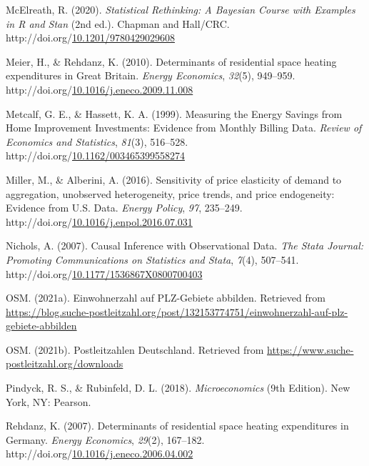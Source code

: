 \documentclass[12pt,twoside]{reedthesis}
\newlength{\cslhangindent}
\newenvironment{CSLReferences}[2] %
 {%
  \setlength{\parindent}{0pt}
  \ifodd #1 \everypar{\setlength{\hangindent}{\cslhangindent}}\ignorespaces\fi
  \ifnum #2 > 0
  \setlength{\parskip}{#2\baselineskip}
  \fi
 }%
 {}
\begin{document}
\begin{CSLReferences}{1}{0}
\leavevmode{}%
McElreath, R. (2020). \emph{Statistical Rethinking: A Bayesian Course with Examples in R and Stan} (2nd ed.). Chapman and Hall/CRC. http://doi.org/\href{https://doi.org/10.1201/9780429029608}{10.1201/9780429029608}

\leavevmode{}%
Meier, H., \& Rehdanz, K. (2010). Determinants of residential space heating expenditures in Great Britain. \emph{Energy Economics}, \emph{32}(5), 949--959. http://doi.org/\href{https://doi.org/10.1016/j.eneco.2009.11.008}{10.1016/j.eneco.2009.11.008}

\leavevmode{}%
Metcalf, G. E., \& Hassett, K. A. (1999). Measuring the Energy Savings from Home Improvement Investments: Evidence from Monthly Billing Data. \emph{Review of Economics and Statistics}, \emph{81}(3), 516--528. http://doi.org/\href{https://doi.org/10.1162/003465399558274}{10.1162/003465399558274}

\leavevmode{}%
Miller, M., \& Alberini, A. (2016). Sensitivity of price elasticity of demand to aggregation, unobserved heterogeneity, price trends, and price endogeneity: Evidence from U.S. Data. \emph{Energy Policy}, \emph{97}, 235--249. http://doi.org/\href{https://doi.org/10.1016/j.enpol.2016.07.031}{10.1016/j.enpol.2016.07.031}

\leavevmode{}%
Nichols, A. (2007). Causal Inference with Observational Data. \emph{The Stata Journal: Promoting Communications on Statistics and Stata}, \emph{7}(4), 507--541. http://doi.org/\href{https://doi.org/10.1177/1536867X0800700403}{10.1177/1536867X0800700403}

\leavevmode{}%
OSM. (2021a). Einwohnerzahl auf PLZ-Gebiete abbilden. Retrieved from \url{https://blog.suche-postleitzahl.org/post/132153774751/einwohnerzahl-auf-plz-gebiete-abbilden}

\leavevmode{}%
OSM. (2021b). Postleitzahlen Deutschland. Retrieved from \url{https://www.suche-postleitzahl.org/downloads}

\leavevmode{}%
Pindyck, R. S., \& Rubinfeld, D. L. (2018). \emph{Microeconomics} (9th Edition). New York, NY: Pearson.

\leavevmode{}%
Rehdanz, K. (2007). Determinants of residential space heating expenditures in Germany. \emph{Energy Economics}, \emph{29}(2), 167--182. http://doi.org/\href{https://doi.org/10.1016/j.eneco.2006.04.002}{10.1016/j.eneco.2006.04.002}


\end{CSLReferences}
\end{document}
